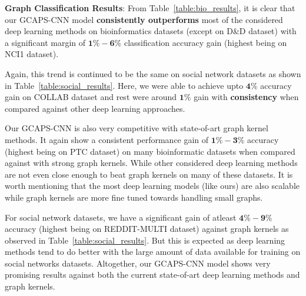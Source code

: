 \documentclass{article}
\begin{document}
\noindent \textbf{Graph Classification Results}: From Table~\ref{table:bio_results}, it is   clear that our GCAPS-CNN  model \textbf{consistently outperforms}  most of the considered deep learning methods on       bioinformatics datasets (except on   D\&D dataset)   with a significant margin of $\mathbf{1\textbf{\%}-6\textbf{\%}}$ classification accuracy gain (highest   being on NCI1 dataset). 

Again, this trend is continued to be the same on   social network datasets as shown in Table~\ref{table:social_results}.  Here, we were able to achieve upto  $\mathbf{4\textbf{\%}}$ accuracy gain on COLLAB dataset and rest were around $\mathbf{1\textbf{\%}}$ gain   with \textbf{consistency} when compared against other deep learning approaches.

Our GCAPS-CNN is also very competitive with state-of-art graph kernel methods. It again  show a consistent performance gain of   $\mathbf{1\textbf{\%}-3\textbf{\%}}$ accuracy  (highest being on PTC dataset)  on many bioinformatic datasets when compared against with strong graph kernels.  While other considered deep learning methods are   not even close enough to  beat graph kernels on many of these  datasets. It is worth mentioning that the most deep learning models (like ours) are also scalable     while graph kernels are more fine tuned towards handling small graphs.  

For social network datasets, we have a significant gain of atleast $\mathbf{4\textbf{\%}-9\textbf{\%}}$ accuracy (highest being on REDDIT-MULTI dataset) against graph kernels as observed in  Table~\ref{table:social_results}. But this is expected as deep learning methods tend to do better with the large amount of data available for training on social networks datasets. Altogether, our GCAPS-CNN model shows very promising results against both  the current state-of-art  deep learning methods and graph kernels.  
\end{document}
